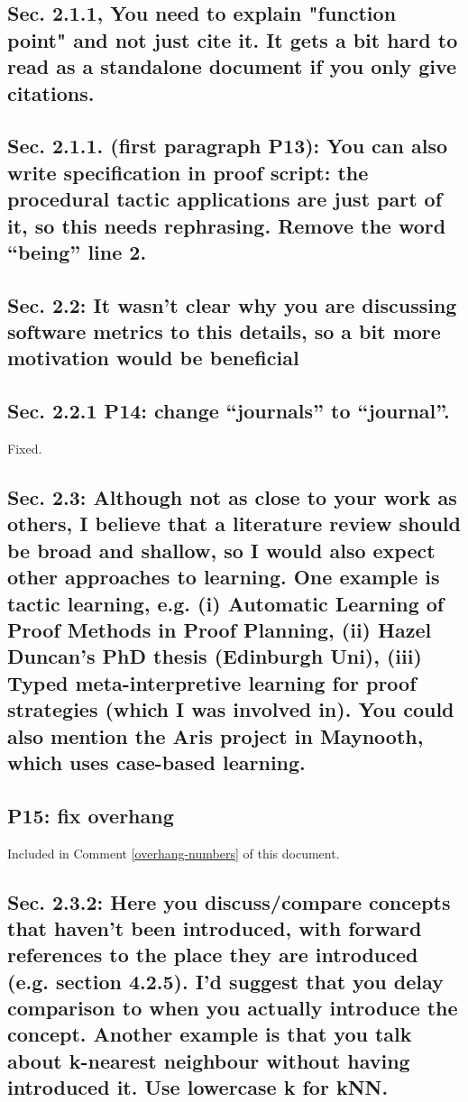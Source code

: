\documentclass[]{article}
\begin{document}
\subsection{Sec. 2.1.1, You need to explain "function point" and not just cite it. It gets a bit hard to read as a standalone document if you only give citations.}

\subsection{Sec. 2.1.1. (first paragraph P13): You can also write specification in proof script: the procedural tactic applications are just part of it, so this needs rephrasing. Remove the word “being” line 2.} 
	
\subsection{Sec. 2.2: It wasn't clear why you are discussing software metrics to this details, so a bit more motivation would be beneficial}

\subsection{Sec. 2.2.1 P14: change “journals” to “journal”.}

Fixed.

\subsection{Sec. 2.3: Although not as close to your work as others, I believe that a literature review should be broad and shallow, so I would also expect other approaches to learning. One example is tactic learning, e.g. (i) Automatic Learning of Proof Methods in Proof Planning, (ii) Hazel Duncan's PhD thesis (Edinburgh Uni), (iii) Typed meta-interpretive learning for proof strategies (which I was involved in). You could also mention the Aris project in Maynooth, which uses case-based learning.}

\subsection{P15: fix overhang}

Included in Comment \ref{overhang-numbers} of this document.

\subsection{Sec. 2.3.2: Here you discuss/compare concepts that haven't been introduced, with forward references to the place they are introduced (e.g. section 4.2.5). I'd suggest that you delay comparison to when you actually introduce the concept. Another example is that you talk about k-nearest neighbour without having introduced it. Use lowercase k for kNN.}
\end{document}
